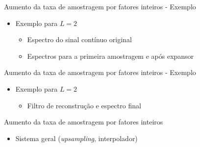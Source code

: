 \begin{slide}{Aumento da taxa de amostragem por fatores inteiros - Exemplo}
	\begin{itemize}
		\item Exemplo para $L=2$
			\begin{itemize}
				\item Espectro do sinal contínuo original
			\begin{figure}
				\centering
		        \end{figure}
		\item Espectros para a primeira amostragem e após expansor
			\begin{figure}
				\centering
		        \end{figure}
			\end{itemize}
	\end{itemize}
\end{slide}

\begin{slide}{Aumento da taxa de amostragem por fatores inteiros - Exemplo}
	\begin{itemize}
		\item Exemplo para $L=2$
			\begin{itemize}
		\item Filtro de reconstrução e espectro final 
			\begin{figure}
				\centering
		        \end{figure}
			\end{itemize}
	\end{itemize}
\end{slide} 
\begin{slide}{Aumento da taxa de amostragem por fatores inteiros}
	\begin{itemize}
		\item Sistema geral (\emph{upsampling}, interpolador) 
			\begin{figure}
				\centering
		        \end{figure}
	\end{itemize}
\end{slide} 

